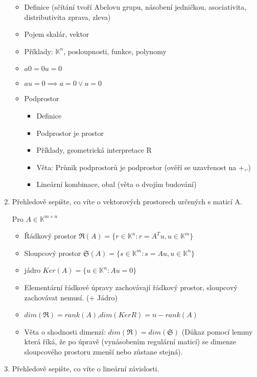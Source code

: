 \documentclass[10pt,a4paper]{article}
\begin{document}
\begin{enumerate}
\begin{itemize}[label=$\circ$]
\item Definice (sčítání tvoří Abelovu grupu, násobení jedničkou, asociativita, distributivita zprava, zleva)
\item Pojem skalár, vektor
\item Příklady: $\mathbb{K}^n$, posloupnosti, funkce, polynomy
\item $a0 = 0u = 0$
\item $a u = 0 \implies a = 0 \vee u = 0$
\item Podprostor \begin{itemize}
\item Definice
\item Podprostor je prostor
\item Příklady, geometrická interpretace R
\item Věta: Průnik podprostorů je podprostor (ověří se uzavřenost na +,.) 
\item Lineární kombinace, obal (věta o dvojím budování)
\end{itemize} 
\end{itemize}

\item Přehledově sepište, co víte o vektorových prostorech určených s maticí A. 

Pro $A \in \mathbb{K}^{m\times n}$
\begin{itemize}[label=$\circ$]
\item Řádkový prostor $\mathfrak{R}(A)= \{ r \in \mathbb{K}^n: r =A^Tu, u \in \mathbb{K}^m\}$
\item Sloupcový prostor $\mathfrak{S}(A)= \{ s \in \mathbb{K}^m: s =Au, u \in \mathbb{K}^n\}$
\item jádro $Ker(A)= \{ u \in \mathbb{K}^n: Au =  0 \}$
\item Elementární řádkové úpravy zachovávají řádkový prostor, sloupcový zachovávat nemusí. (+ Jádro)
\item $dim(\mathfrak{R}) = rank(A)$,$dim(Ker{R}) = n - rank(A)$
\item Věta o shodnosti dimenzí: $ dim(\mathfrak{R}) = dim(\mathfrak{S})$ (Důkaz pomocí lemmy která říká, že po úpravě (vynásobením regulární maticí) se dimenze sloupcového prostoru zmenší nebo zůstane stejná).
\end{itemize}


\item Přehledově sepište, co víte o lineární závislosti.


\end{enumerate}
\end{document}
